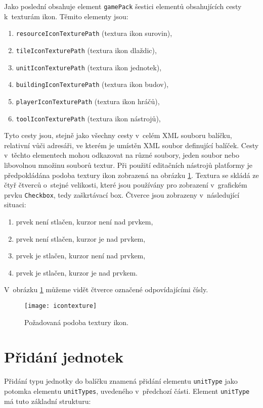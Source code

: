 Jako poslední obsahuje element \texttt{gamePack} šestici elementů obsahujících cesty k~texturám ikon. Těmito elementy jsou:
\begin{enumerate}
	\item \texttt{resourceIconTexturePath} (textura ikon surovin),
	\item \texttt{tileIconTexturePath} (textura ikon dlaždic),
	\item \texttt{unitIconTexturePath} (textura ikon jednotek),
	\item \texttt{buildingIconTexturePath} (textura ikon budov),
	\item \texttt{playerIconTexturePath} (textura ikon hráčů),
	\item \texttt{toolIconTexturePath} (textura ikon nástrojů),
\end{enumerate}
Tyto cesty jsou, stejně jako všechny cesty v~celém XML souboru balíčku, relativní vůči adresáři, ve kterém je umístěn XML soubor definující balíček. Cesty v~těchto elementech mohou odkazovat na různé soubory, jeden soubor nebo libovolnou množinu souborů textur. Při použití editačních nástrojů platformy je předpokládána podoba textury ikon zobrazená na obrázku \ref{fig:icontexture}. Textura se skládá ze čtyř čtverců o~stejné velikosti, které jsou používány pro zobrazení v~grafickém prvku \texttt{Checkbox}, tedy zaškrtávací box. Čtverce jsou zobrazeny v~následující situaci:
\begin{enumerate}
	\item prvek není stlačen, kurzor není nad prvkem,
	\item prvek není stlačen, kurzor je nad prvkem,
	\item prvek je stlačen, kurzor není nad prvkem,
	\item prvek je stlačen, kurzor je nad prvkem.
\end{enumerate}

V~obrázku \ref{fig:icontexture} můžeme vidět čtverce označené odpovídajícími čísly.

\begin{figure}[h]
	\centering
	\texttt{[image: icontexture]}
	\caption{Požadovaná podoba textury ikon.}
	\label{fig:icontexture}
\end{figure}

\section{Přidání jednotek}
\label{sec:addunit}
Přidání typu jednotky do balíčku znamená přidání elementu \texttt{unitType} jako potomka elementu \texttt{unitTypes}, uvedeného v~předchozí části. Element \texttt{unitType} má tuto základní strukturu:


